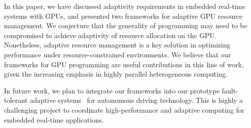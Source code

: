 \documentclass{acm_proc_article-sp}
\begin{document}
In this paper, we have discussed adaptivity requirements in embedded
real-time systems with GPUs, and presented two frameworks for adaptive
GPU resource management.
We conjecture that the generality of programming may need to be compromised
to achieve adaptivity of resource allocation on the GPU.
Nonetheless, adaptive resource management is a key solution in
optimizing performance under resource-constrained environments.
We believe that our frameworks for GPU programming are useful
contributions in this line of work, given the increasing emphasis in 
highly parallel heterogeneous computing.

In future work, we plan to integrate our frameworks into our prototype
fault-tolerant adaptive systems~\cite{Kim_RTSS12} for autonomous driving
technology.
This is highly a challenging project to coordinate high-performance and
adaptive computing for embedded real-time applications.


{\footnotesize

}
\end{document}
